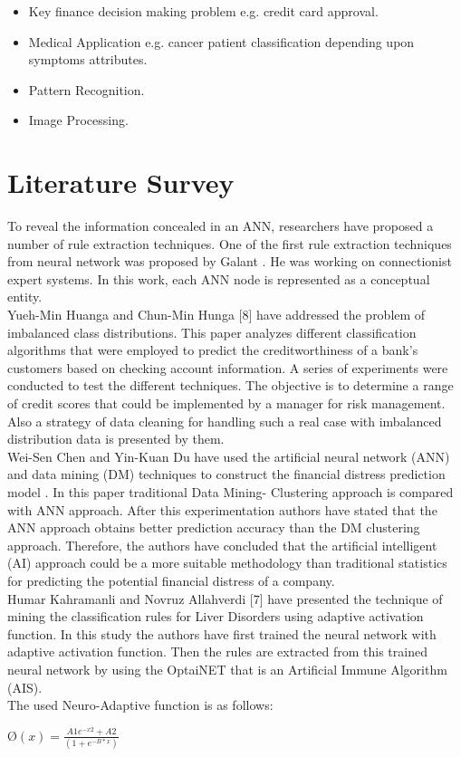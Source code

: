 \documentclass[a4paper,14pt,onecolumn]{article}
\begin{document}
\begin{itemize}
\item Key finance decision making problem e.g. credit card approval.
\item Medical Application e.g. cancer patient classification depending upon symptoms attributes.
\item Pattern Recognition.
\item Image Processing.
\end{itemize}

\newpage
\section{Literature Survey}
          To reveal the information concealed in an ANN, researchers have proposed a number of rule extraction techniques. One of the first rule extraction techniques from neural network was proposed by Galant . He was working on connectionist expert systems. In this work, each ANN node is represented as a conceptual entity.\\
     Yueh-Min Huanga and  Chun-Min Hunga [8] have  addressed the problem of imbalanced class distributions. This paper analyzes different classification algorithms that were employed to predict the creditworthiness of a bank’s customers based on checking account information. A series of experiments were conducted to test the different techniques. The objective is to determine a range of credit scores that could be implemented by a manager for risk management. Also a strategy of data cleaning for handling such a real case with imbalanced distribution data is presented by them.\\
      Wei-Sen Chen  and Yin-Kuan Du  have used the artificial neural network (ANN) and data mining (DM) techniques to construct the financial distress prediction model . In this paper traditional Data Mining- Clustering approach is compared with ANN approach. After this experimentation authors have stated that the ANN approach obtains better prediction accuracy than the DM clustering approach. Therefore, the authors have concluded that the artificial intelligent (AI) approach could be a more suitable methodology than traditional statistics for predicting the potential financial distress of a company.\\
      Humar Kahramanli and  Novruz Allahverdi [7] have presented the technique of mining the classification rules for Liver Disorders using adaptive activation function. In this study the authors have first trained the neural network with adaptive activation function. Then the rules are extracted from this trained neural network by using the OptaiNET that is an Artificial Immune Algorithm (AIS).\\
    The used Neuro-Adaptive function is as follows:\\
\begin{center}
$Ø(x) =\frac{A1 e^{- x2}+A2}{(1+e^{-B*x})}$\\
\end{center}
\end{document}

